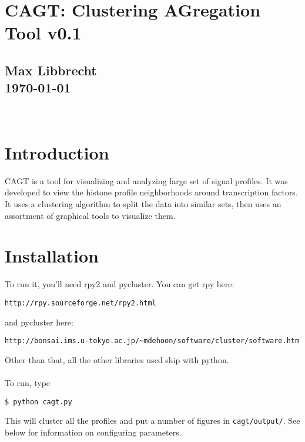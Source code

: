 \documentclass[11pt]{article}
\begin{document}
{\center

\section*{CAGT: Clustering AGregation Tool v0.1}
\subsection*{Max Libbrecht\\\today}} \ \\ 


\section*{Introduction}
CAGT is a tool for visualizing and analyzing large set of signal profiles.  It was developed to view the histone profile neighborhoods around transcription factors.  It uses a clustering algorithm to split the data into similar sets, then uses an assortment of graphical tools to visualize them.


\section*{Installation}
To run it, you'll need rpy2 and pycluster.  You can get rpy here:
\begin{verbatim}http://rpy.sourceforge.net/rpy2.html\end{verbatim}
and pycluster here:
\begin{verbatim}http://bonsai.ims.u-tokyo.ac.jp/~mdehoon/software/cluster/software.htm\end{verbatim}
Other than that, all the other libraries used ship with python.
\\ \\
To run, type
\begin{verbatim}$ python cagt.py\end{verbatim}
This will cluster all the profiles and put a number of figures in \verb!cagt/output/!.
See below for information on configuring parameters.
\end{document}
